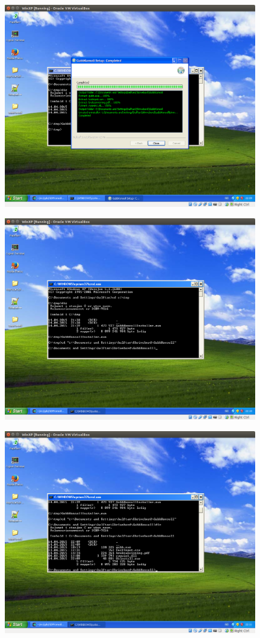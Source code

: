 \documentclass[12pt]{book}
\begin{document}
\includegraphics[width=11cm]{006}

\includegraphics[width=11cm]{007}

\includegraphics[width=11cm]{008}
\end{document}

